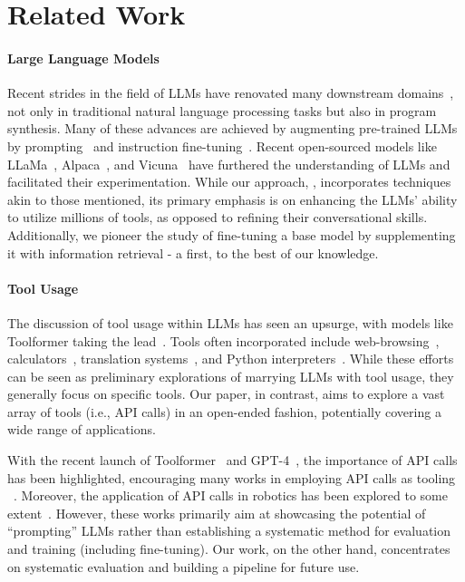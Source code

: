 \section{Related Work}
\label{sec:related}

\paragraph{Large Language Models}
Recent strides in the field of LLMs have renovated many downstream domains~\cite{chowdhery2022palm, touvron2023llama, zhang2022opt, zeng2022glm}, not only in traditional natural language processing tasks but also in program synthesis. Many of these advances are achieved by augmenting pre-trained LLMs by prompting~\cite{wei2022chain, gao2022pal} and instruction fine-tuning~\cite{chung2022scaling, sanh2021multitask, wang2022super, iyer2022opt}. Recent open-sourced models like
LLaMa~\cite{touvron2023llama}, Alpaca~\cite{alpaca}, and Vicuna~\cite{vicuna} have furthered the understanding of LLMs and facilitated their experimentation. While our approach, \oursmethod{}, incorporates techniques akin to those mentioned, its primary emphasis is on enhancing the LLMs' ability to utilize millions of tools, as opposed to refining their conversational skills. Additionally, we pioneer the study of fine-tuning a base model by supplementing it with information retrieval - a first, to the best of our knowledge.

\paragraph{Tool Usage}
The discussion of tool usage within LLMs has seen an upsurge, with models like Toolformer taking the lead~\cite{schick2023toolformer, komeili2021internet, lazaridou2022internet, nakano2021webgpt}. Tools often incorporated include web-browsing~\cite{schick2020exploiting}, calculators~\cite{cobbe2021training, thoppilan2022lamda}, translation systems~\cite{thoppilan2022lamda}, and Python interpreters~\cite{gao2022pal}. 
While these efforts can be seen as preliminary explorations of marrying LLMs with tool usage, they generally focus on specific tools. Our paper, in contrast, aims to explore a vast array of tools (i.e., API calls) in an open-ended fashion, potentially covering a wide range of applications. 


With the recent launch of Toolformer~\cite{schick2023toolformer} and GPT-4~\cite{openai2023gpt4}, the importance of API calls has been highlighted, encouraging many works in employing API calls as tooling
~\cite{shen2023hugginggpt, liang2023taskmatrix}. Moreover, the application of API calls in robotics has been explored to some extent~\cite{vemprala2023chatgpt, ahn2022can}. However, these works primarily aim at showcasing the potential of ``prompting'' LLMs rather than establishing a systematic method for evaluation and training (including fine-tuning). Our work, on the other hand, concentrates on systematic evaluation and building a pipeline for future use.

